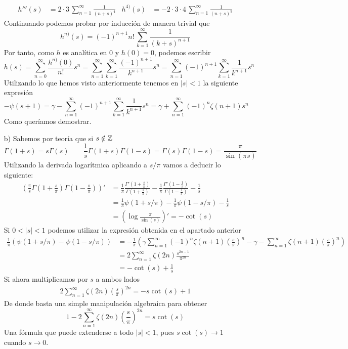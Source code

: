 \documentclass[twoside]{article}
\begin{document}
\begin{sol}
\begin{itemize}
\begin{align*}
h'''(s) &= 2 \cdot 3 \, \sum_{n=1}^\infty\frac{1}{(n+s)^4} &  h^{4)}(s) &= -2 \cdot 3 \cdot 4 \,\sum_{n=1}^\infty\frac{1}{(n+s)^5}
\end{align*}
Continuando podemos probar por inducción de manera trivial que
$$h^{n)}(s) = (-1)^{n+1}n!\,\sum_{k=1}^\infty\frac{1}{(k+s)^{n+1}}$$
Por tanto, como $h$ es analítica en $0$ y $h(0)=0$, podemos escribir
$$
h(s)=\sum_{n=0}^\infty \frac{h^{n)}(0)}{n!}s^n = \sum_{n=1}^\infty\sum_{k=1}^\infty\frac{(-1)^{n+1}}{k^{n+1}}  s^n = \sum_{n=1}^\infty(-1)^{n+1}\sum_{k=1}^\infty\frac{1}{k^{n+1}}  s^n 
$$
Utilizando lo que hemos visto anteriormente tenemos en $|s|<1$ la siguiente expresión
$$
-\psi(s+1) = \gamma -  \sum_{n=1}^\infty(-1)^{n+1}\sum_{k=1}^\infty\frac{1}{k^{n+1}}  s^n = \gamma + \sum_{n=1}^\infty(-1)^{n}\zeta(n+1) s^n
$$
Como queríamos demostrar.
\newpage
\item[b)] Sabemos por teoría que si $s\notin \mathbb{Z}$
$$\Gamma(1+s)=s\Gamma(s)  \qquad \frac{1}{s}\Gamma(1+s)\Gamma(1-s)= 	\Gamma(s)\Gamma(1-s)=\frac{\pi}{\sin(\pi s)} \qquad 
$$
Utilizando la derivada logarítmica aplicando a $s/\pi$ vamos a deducir lo siguiente:
\begin{align*}
\left(\frac{\pi}{s}\Gamma\left(1+\frac{s}{\pi}\right)\Gamma\left(1-\frac{s}{\pi}\right)\right)' & = \frac{1}{\pi}\frac{\Gamma'\left(1+\frac{s}{\pi}\right)}{\Gamma\left(1+\frac{s}{\pi}\right)} - \frac{1}{\pi}\frac{\Gamma'(1-\frac{1}{\pi})}{\Gamma(1-\frac{1}{\pi})} - \frac{1}{s}\\
 &= \frac{1}{\pi}\psi(1+s/\pi)-\frac{1}{\pi}\psi(1-s/\pi) - \frac{1}{s}\\
&=\left(\log\frac{\pi}{\sin(s)}\right)'  = -\cot(s)
\end{align*}
Si $0<|s|<1$ podemos utilizar la expresión obtenida en el apartado anterior
\begin{align*}
\frac{1}{\pi}\left(\psi(1+s/\pi)-\psi(1-s/\pi)\right) &=  -\frac{1}{\pi}\left(\gamma \sum_{n=1}^\infty(-1)^{n}\zeta(n+1) \left(\frac{s}{\pi}\right)^n -  \gamma - \sum_{n=1}^\infty\zeta(n+1) \left(\frac{s}{\pi}\right)^n\right)\\
&=2\sum_{n=1}^\infty \zeta(2n)\frac{s^{2n-1}}{\pi^{2n}}\\
&=-\cot(s)+\frac{1}{s}
\end{align*}
Si ahora multiplicamos por $s$ a ambos lados
\begin{gather*}
2\sum_{n=1}^\infty \zeta(2n)\left(\frac{s}{\pi}\right)^{2n}=-s\cot(s)+1 
\end{gather*}
De donde basta una simple manipulación algebraica para obtener
$$
1-2\sum_{n=1}^\infty \zeta(2n)\left(\frac{s}{\pi}\right)^{2n}=s\cot(s)
$$
Una fórmula que puede extenderse a todo $|s|<1$, pues $s\cot(s)\to 1$ cuando $s\to 0$.
\end{itemize}
\end{sol}
\newpage
\end{document}
